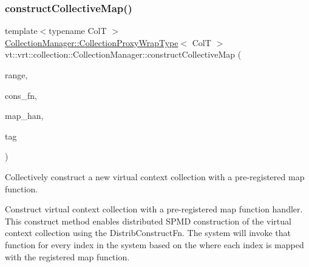 \mbox{\label{structvt_1_1vrt_1_1collection_1_1_collection_manager_ae4f96ce01b13d68e5f3a8be7bea7e439}} 
\subsubsection{\texorpdfstring{construct\+Collective\+Map()}{constructCollectiveMap()}}
{\footnotesize\ttfamily template$<$typename ColT $>$ \\
\hyperlink{structvt_1_1vrt_1_1collection_1_1_collection_manager_a56458ed7f9bb22b631b9b3a745f42f94}{Collection\+Manager\+::\+Collection\+Proxy\+Wrap\+Type}$<$ ColT $>$ vt\+::vrt\+::collection\+::\+Collection\+Manager\+::construct\+Collective\+Map (\begin{DoxyParamCaption}\item[{typename Col\+T\+::\+Index\+Type}]{range,  }\item[{\hyperlink{structvt_1_1vrt_1_1collection_1_1_collection_manager_a7503830bc133013d542856fa39834dcc}{Distrib\+Construct\+Fn}$<$ ColT $>$}]{cons\+\_\+fn,  }\item[{\hyperlink{namespacevt_af64846b57dfcaf104da3ef6967917573}{Handler\+Type} const \&}]{map\+\_\+han,  }\item[{\hyperlink{namespacevt_a84ab281dae04a52a4b243d6bf62d0e52}{Tag\+Type} const \&}]{tag }\end{DoxyParamCaption})}



Collectively construct a new virtual context collection with a pre-\/registered map function. 

Construct virtual context collection with a pre-\/registered map function handler. This construct method enables distributed S\+P\+MD construction of the virtual context collection using the {\ttfamily Distrib\+Construct\+Fn}. The system will invoke that function for every index in the system based on the where each index is mapped with the registered map function.


